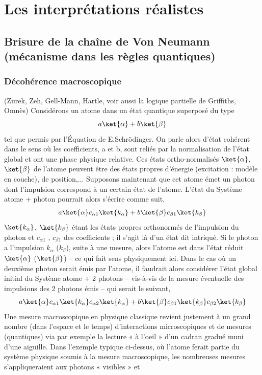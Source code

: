 \section{Les interprétations réalistes}
\subsection{Brisure de la chaîne de Von Neumann (mécanisme dans les règles quantiques)}
\subsubsection{Décohérence macroscopique}
(Zurek, Zeh, Gell-Mann, Hartle, voir aussi la logique partielle de Griffiths, Omnès)
Considérons un atome dans un état quantique superposé du type
\[
a\ket{\alpha}+b\ket{\beta}
\]
tel que permis par l’Équation de E.Schrödinger. On parle alors d’état cohérent dans le sens
où les coefficients, a et b, sont reliés par la normalisation de l’état global et ont une phase
physique relative. Ces états ortho-normalisés $\ket{\alpha}$,
 $\ket{\beta}$ de l’atome peuvent être des états
propres d’énergie (excitation : modèle en couche), de position,... Supposons maintenant que
cet atome émet un photon dont l’impulsion correspond à un certain état de l’atome. L’état du
Système atome + photon pourrait alors s’écrire comme suit,
\[
a\ket{\alpha}c_{\alpha 1}\ket{k_\alpha}+b\ket{\beta}c_{\beta 1}\ket{k_\beta}
\]
$\ket{k_\alpha}$, $\ket{k_\beta}$ étant les états propres orthonormés de l’impulsion du photon
 et $c_{\alpha 1}$ , $c_{\beta 1}$ des coefficients ; il s’agit là d’un état dit intriqué. Si
 le photon a l’impulsion $k_\alpha$ ($k_\beta$), suite à une
mesure, alors l’atome est dans l’état réduit $\ket{\alpha}$ ($\ket{\beta}$) – ce qui fait
 sens physiquement ici.
Dans le cas où un deuxième photon serait émis par l’atome, il faudrait alors considérer l’état
global initial du Système atome + 2 photons – vis-à-vis de la mesure éventuelle des
impulsions des 2 photons émis – qui serait le suivant,
\[
a\ket{\alpha}c_{\alpha 1}\ket{k_\alpha}c_{\alpha 2}\ket{k_\alpha}+
b\ket{\beta}c_{\beta 1}\ket{k_\beta}c_{\beta 2}\ket{k_\beta}
\]
Une mesure macroscopique en physique classique revient justement à un grand nombre
(dans l’espace et le temps) d’interactions microscopiques et de mesures (quantiques) via par
exemple la lecture « à l’oeil » d’un cadran gradué muni d’une aiguille. Dans l’exemple
typique ci-dessus, où l’atome ferait partie du système physique soumis à la mesure
macroscopique, les nombreuses mesures s’appliqueraient aux photons « visibles » et
